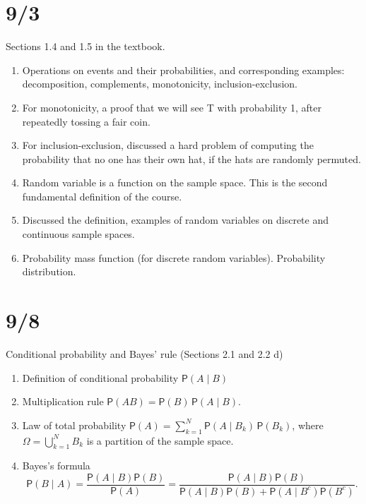 \documentclass[letterpaper,11pt,oneside,reqno]{amsart}
\numberwithin{equation}{section}
\theoremstyle{definition}
\begin{document}
\section{9/3}

Sections 1.4 and 1.5 in the textbook.

\begin{enumerate}
	\item Operations on events and their probabilities, and 
		corresponding examples: decomposition, complements, monotonicity, inclusion-exclusion.
	\item For monotonicity, a proof that we will see T with probability 1, after repeatedly 
		tossing a fair coin.
	\item For inclusion-exclusion, discussed a hard problem of computing the 
		probability that no one has their own hat, if the hats are randomly permuted.
	\item Random variable is a function on the sample space.
		This is the second fundamental definition 
		of the course.
	\item Discussed the definition, examples of random variables
		on discrete and continuous sample spaces.
	\item Probability mass function (for discrete random variables).
		Probability distribution.
\end{enumerate}

\section{9/8}

Conditional probability and Bayes' rule (Sections 2.1 and 2.2 d)
\begin{enumerate}
	\item Definition of conditional probability $\mathsf{P}(A\mid B)$
	\item Multiplication rule
		$\mathsf{P}(AB)=\mathsf{P}(B)\, \mathsf{P}(A\mid B)$.
	\item Law of total probability
		$\mathsf{P}(A)=\sum_{k=1}^{N}\mathsf{P}(A\mid B_k)\,\mathsf{P}(B_k)$,
		where $\Omega=\bigcup_{k=1}^{N}B_k$ is a partition of the sample space.
	\item Bayes's formula 
		$$\mathsf{P}(B \mid A)=\frac{\mathsf{P}(A\mid B)\mathsf{P}(B)}{\mathsf{P}(A)}=
		\frac{\mathsf{P}(A\mid B)\mathsf{P}(B)}
		{\mathsf{P}(A\mid B)\mathsf{P}(B)
		+
		\mathsf{P}(A\mid B^c)\mathsf{P}(B^c)}.
		$$
\end{enumerate}
\end{document}
